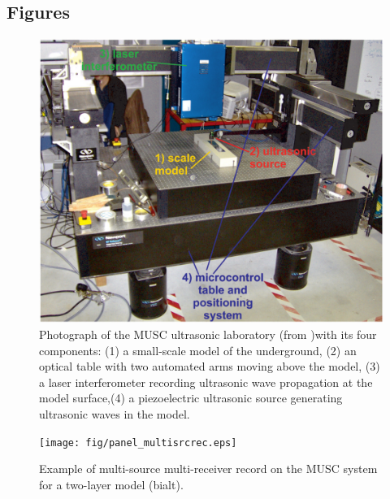 \documentclass[manuscript,revised]{geophysics}
\begin{document}
\subsection*{Figures}

\begin{figure}[!h]
	\centering
	\includegraphics[scale=0.5]{fig/panel_musc_bench.eps}
	\caption{Photograph of the MUSC ultrasonic laboratory (from \citet{Bretaudeau_FWI_2013} )with its four components: (1) a small-scale model of the underground, (2) an optical table with two automated arms moving above the model, (3) a laser interferometer recording ultrasonic wave propagation	at the model surface,(4) a piezoelectric ultrasonic source generating ultrasonic waves in the model.}
	\label{panel_musc_bench}
\end{figure}

\begin{figure}[!h]
	\centering
	\texttt{[image: fig/panel\_multisrcrec.eps]}
	\caption{Example of multi-source multi-receiver record on the MUSC system for a two-layer model (bialt).}
	\label{panel_multisrcrec}
\end{figure}
\end{document}
